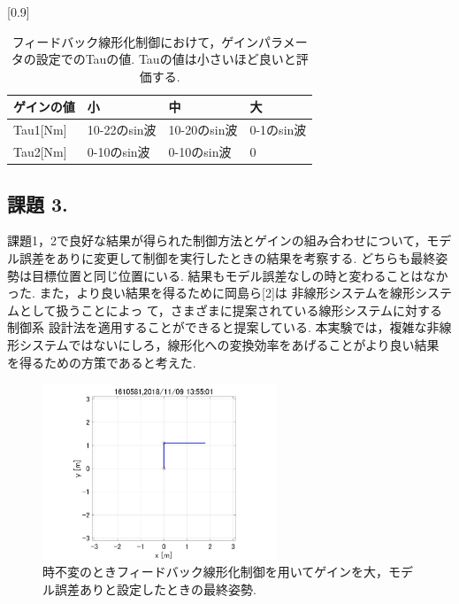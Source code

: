 \documentclass[twocolumn, 10pt,a4j]{jsarticle}
\begin{document}
    \begin{table}[H]
      \begin{center}
        \caption{フィードバック線形化制御におけて，ゲインパラメータの設定でのTauの値. Tauの値は小さいほど良いと評価する.}
        \scalebox{0.8}[0.9] {
          \begin{tabular}{llll}
          ゲインの値 & 小 & 中  & 大 \\ \hline
          Tau1[Nm] & 10-22のsin波 & 10-20のsin波 & 0-1のsin波 \\
          Tau2[Nm] & 0-10のsin波 & 0-10のsin波 & 0
          \end{tabular}
        }
      \end{center}
    \end{table}

  \subsection{課題 3.}
    課題1，2で良好な結果が得られた制御方法とゲインの組み合わせについて，モデル誤差をありに変更して制御を実行したときの結果を考察する.
    どちらも最終姿勢は目標位置と同じ位置にいる. 結果もモデル誤差なしの時と変わることはなかった. また，より良い結果を得るために岡島ら[2]は
    非線形システムを線形システムとして扱うことによっ
    て，さまざまに提案されている線形システムに対する制御系
    設計法を適用することができると提案している. 本実験では，複雑な非線形システムではないにしろ，線形化への変換効率をあげることがより良い結果
    を得るための方策であると考えた.

    \begin{figure}[H]
      \begin{center}
        \includegraphics[width=7cm]{../img/img/kansetu_FB_zifuhen_large_yes_model_gosa_saisyu_sisei.jpg}
        \caption{時不変のときフィードバック線形化制御を用いてゲインを大，モデル誤差ありと設定したときの最終姿勢.}
      \end{center}
    \end{figure}
\end{document}
